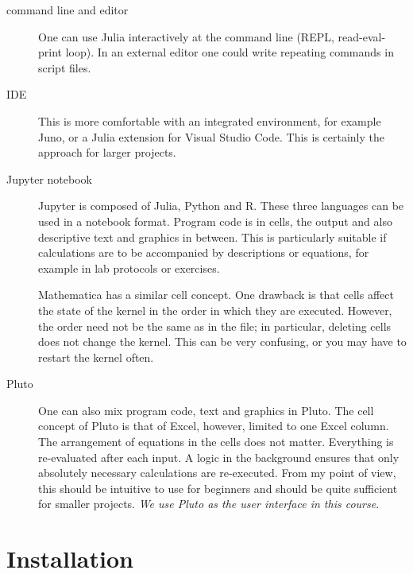 \begin{description}
\item[command line and editor] One can use Julia interactively at the command line (REPL, read-eval-print loop). In an external editor one could write repeating commands in script files.

\item[IDE] This is more comfortable with an integrated environment, for example Juno, or a Julia extension 
for Visual Studio Code. This is certainly the approach for larger projects.

\item[Jupyter notebook] Jupyter is composed of Julia, Python and R. These three languages can be used in a notebook format. Program code is in cells, the output and also descriptive text and graphics in between. This is particularly suitable if calculations are to be accompanied by descriptions or equations, for example in lab protocols or exercises. 


Mathematica has a similar cell concept. One drawback is that cells affect the state of the kernel in the order in which they are executed. However, the order need not be the same as in the file; in particular, deleting cells does not change the kernel. This can be very confusing, or you may have to restart the kernel often.

\item[Pluto] One can also mix program code, text and graphics in Pluto. The cell concept of Pluto is that of Excel, however, limited to one Excel column. The arrangement of equations in the cells does not matter. Everything is re-evaluated after each input. A logic in the background ensures that only absolutely necessary calculations are re-executed. From my point of view, this should be intuitive to use for beginners and should be quite sufficient for smaller projects. \emph{We use Pluto as the user interface in this course}.

\end{description}



\section{Installation}


